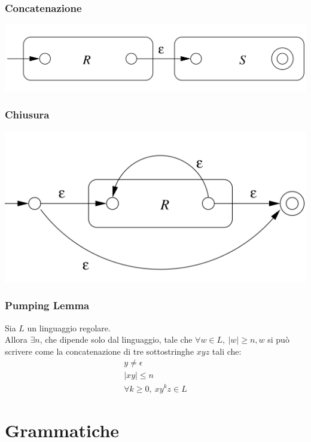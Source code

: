 \documentclass[12pt]{article}
\begin{document}
\subsubsection*{Concatenazione}
\includegraphics[scale=0.07]{assets/concatenazione.png}
\subsubsection*{Chiusura}
\includegraphics[scale=0.07]{assets/chiusura.png}

\subsubsection{Pumping Lemma}

Sia $L$ un linguaggio regolare.\\
Allora $\exists n$, che dipende solo dal linguaggio, tale che $\forall w \in L,\ |w| \ge n, w$ si può scrivere come la concatenazione di tre  sottostringhe $xyz$ tali che:
\begin{gather*}
    y\neq \epsilon\\
    |xy| \leq n \\
    \forall k \geq 0,\ xy^kz \in L
\end{gather*}

\section{Grammatiche}
\end{document}
